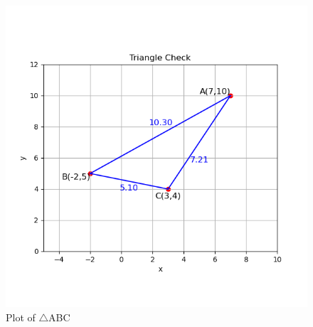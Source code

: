 \documentclass[journal]{IEEEtran}
\begin{document}
\begin{figure}[h!]
   \centering
   \includegraphics[width=0.7\linewidth]{figs/01.png}
   \caption{Plot of $\triangle$ABC}
   \label{Plot_1}
\end{figure}
\end{document}

